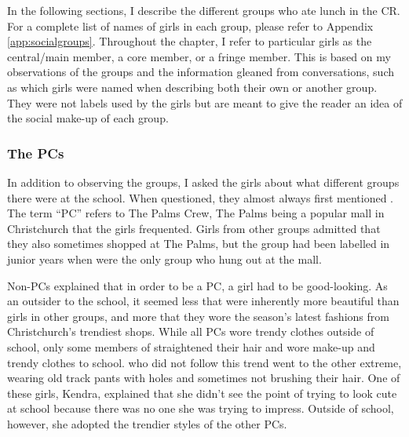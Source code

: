 In the following sections, I describe the different groups who ate lunch in the CR. For a complete list of names of girls in each group, please refer to Appendix \ref{app:socialgroups}. Throughout the chapter, I refer to particular girls as the central/main member, a core member, or a fringe member. This is based on my observations of the groups and the information gleaned from conversations, such as which girls were named when describing both their own or another group. They were not labels used by the girls but are meant to give the reader an idea of the social make-up of each group.

\largerpage
\subsubsection{The PCs}
In addition to observing the groups, I asked the girls about what different groups there were at the school. When questioned, they almost always first mentioned . The term ``PC'' refers to The Palms Crew, The Palms being a popular mall in Christchurch that the girls frequented. Girls from other groups admitted that they also sometimes shopped at The Palms, but the group had been labelled in junior years when  were the only group who hung out at the mall.

Non-PCs explained that in order to be a PC, a girl had to be good-looking. As an outsider to the school, it seemed less that  were inherently more beautiful than girls in other groups, and more that they wore the season's latest fashions from Christchurch's trendiest shops. While all PCs wore trendy clothes outside of school, only some members of  straightened their hair and wore make-up and trendy clothes to school.  who did not follow this trend went to the other extreme, wearing old track pants with holes and sometimes not brushing their hair. One of these girls, Kendra, explained that she didn't see the point of trying to look cute at school because there was no one she was trying to impress. Outside of school, however, she adopted the trendier styles of the other PCs. 

